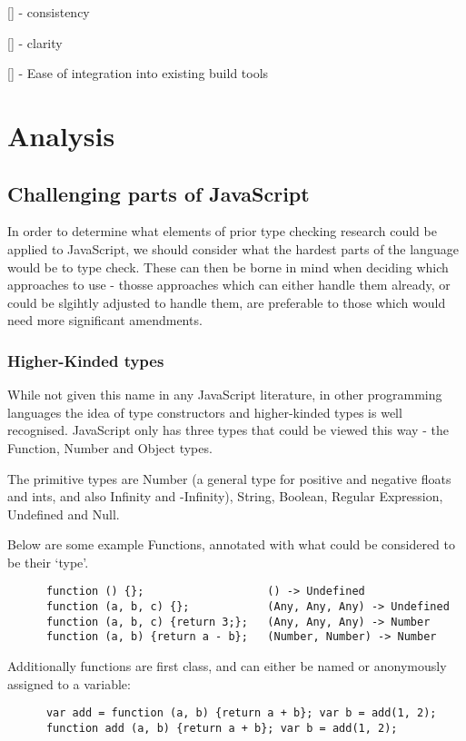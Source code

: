 \documentclass[british, twoside]{bhamthesis}
\theoremstyle{definition}
\begin{document}
  [] - consistency

  [] - clarity

  [] - Ease of integration into existing build tools

\chapter{Analysis}

  \section{Challenging parts of JavaScript}

    In order to determine what elements of prior type checking research could be applied to JavaScript, we should consider what the hardest parts of the language would be to type check. These can then be borne in mind when deciding which approaches to use - thosse approaches which can either handle them already, or could be slgihtly adjusted to handle them, are preferable to those which would need more significant amendments.

  \subsection{Higher-Kinded types}
    While not given this name in any JavaScript literature, in other programming languages the idea of type constructors and higher-kinded types is well recognised. JavaScript only has three types that could be viewed this way - the Function, Number and Object types.

    The primitive types are Number (a general type for positive and negative floats and ints, and also Infinity and -Infinity), String, Boolean, Regular Expression, Undefined and Null.

    Below are some example Functions, annotated with what could be considered to be their `type'.

    \begin{lstlisting}
      function () {};                   () -> Undefined
      function (a, b, c) {};            (Any, Any, Any) -> Undefined
      function (a, b, c) {return 3;};   (Any, Any, Any) -> Number
      function (a, b) {return a - b};   (Number, Number) -> Number
    \end{lstlisting}

    Additionally functions are first class, and can either be named or anonymously assigned to a variable:

    \begin{lstlisting}
      var add = function (a, b) {return a + b}; var b = add(1, 2);
      function add (a, b) {return a + b}; var b = add(1, 2);
    \end{lstlisting}
\end{document}
